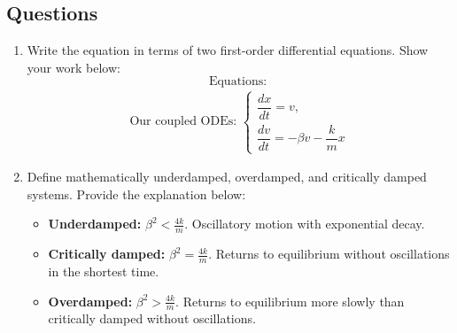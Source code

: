 \documentclass {article}
\begin{document}
\subsection*{Questions}
\begin{enumerate}
    \item Write the equation in terms of two first-order differential equations. Show your work below:
    \[ \text{Equations: } \]
    \begin{equation*}
    \begin{aligned}
    \text{Our coupled ODEs: } 
    \begin{cases}
    \dfrac{dx}{dt} = v,\\[6pt]
    \dfrac{dv}{dt} = -\beta v - \dfrac{k}{m} x
    \end{cases}
    \end{aligned}
    \end{equation*}
    
    \vspace{0.5cm}
    \item Define mathematically underdamped, overdamped, and critically damped systems. Provide the explanation below:
    \begin{itemize}
    \item \textbf{Underdamped:} \( \beta^2 < \frac{4k}{m} \). Oscillatory motion with exponential decay.
    \item \textbf{Critically damped:} \( \beta^2 = \frac{4k}{m} \). Returns to equilibrium without oscillations in the shortest time.
    \item \textbf{Overdamped:} \( \beta^2 > \frac{4k}{m} \). Returns to equilibrium more slowly than critically damped without oscillations.
\end{itemize}
\end{enumerate}
\end{document}
